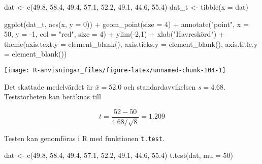 \documentclass[
]{book}
\newenvironment{Shaded}{\begin{snugshade}}{\end{snugshade}}
\newcommand{\AttributeTok}[1]{\textcolor[rgb]{0.77,0.63,0.00}{#1}}
\newcommand{\DecValTok}[1]{\textcolor[rgb]{0.00,0.00,0.81}{#1}}
\newcommand{\FloatTok}[1]{\textcolor[rgb]{0.00,0.00,0.81}{#1}}
\newcommand{\FunctionTok}[1]{\textcolor[rgb]{0.00,0.00,0.00}{#1}}
\newcommand{\NormalTok}[1]{#1}
\newcommand{\OtherTok}[1]{\textcolor[rgb]{0.56,0.35,0.01}{#1}}
\newcommand{\SpecialCharTok}[1]{\textcolor[rgb]{0.00,0.00,0.00}{#1}}
\newcommand{\StringTok}[1]{\textcolor[rgb]{0.31,0.60,0.02}{#1}}
\theoremstyle{definition}
\theoremstyle{definition}
\theoremstyle{definition}
\theoremstyle{definition}
\theoremstyle{remark}
\begin{document}
\begin{Shaded}
\begin{Highlighting}[]
\NormalTok{dat }\OtherTok{\textless{}{-}} \FunctionTok{c}\NormalTok{(}\FloatTok{49.8}\NormalTok{, }\FloatTok{58.4}\NormalTok{, }\FloatTok{49.4}\NormalTok{, }\FloatTok{57.1}\NormalTok{, }\FloatTok{52.2}\NormalTok{, }\FloatTok{49.1}\NormalTok{, }\FloatTok{44.6}\NormalTok{, }\FloatTok{55.4}\NormalTok{)}
\NormalTok{dat\_t }\OtherTok{\textless{}{-}} \FunctionTok{tibble}\NormalTok{(}\AttributeTok{x =}\NormalTok{ dat)}

\FunctionTok{ggplot}\NormalTok{(dat\_t, }\FunctionTok{aes}\NormalTok{(x, }\AttributeTok{y =} \DecValTok{0}\NormalTok{)) }\SpecialCharTok{+}
  \FunctionTok{geom\_point}\NormalTok{(}\AttributeTok{size =} \DecValTok{4}\NormalTok{) }\SpecialCharTok{+}
  \FunctionTok{annotate}\NormalTok{(}\StringTok{"point"}\NormalTok{, }\AttributeTok{x =} \DecValTok{50}\NormalTok{, }\AttributeTok{y =} \SpecialCharTok{{-}}\DecValTok{1}\NormalTok{, }\AttributeTok{col =} \StringTok{"red"}\NormalTok{, }\AttributeTok{size =} \DecValTok{4}\NormalTok{) }\SpecialCharTok{+}
  \FunctionTok{ylim}\NormalTok{(}\SpecialCharTok{{-}}\DecValTok{2}\NormalTok{,}\DecValTok{1}\NormalTok{) }\SpecialCharTok{+} \FunctionTok{xlab}\NormalTok{(}\StringTok{"Havreskörd"}\NormalTok{) }\SpecialCharTok{+}
  \FunctionTok{theme}\NormalTok{(}\AttributeTok{axis.text.y =} \FunctionTok{element\_blank}\NormalTok{(),}
        \AttributeTok{axis.ticks.y =} \FunctionTok{element\_blank}\NormalTok{(),}
        \AttributeTok{axis.title.y =} \FunctionTok{element\_blank}\NormalTok{())}
\end{Highlighting}
\end{Shaded}

\begin{center}\texttt{[image: R-anvisningar\_files/figure-latex/unnamed-chunk-104-1]} \end{center}

Det skattade medelvärdet är \(\bar x = 52.0\) och standardavvikelsen \(s = 4.68\). Teststorheten kan beräknas till

\[t = \frac{52 - 50}{4.68 / \sqrt 8} = 1.209\]

Testen kan genomföras i R med funktionen \texttt{t.test}.

\begin{Shaded}
\begin{Highlighting}[]
\NormalTok{dat }\OtherTok{\textless{}{-}} \FunctionTok{c}\NormalTok{(}\FloatTok{49.8}\NormalTok{, }\FloatTok{58.4}\NormalTok{, }\FloatTok{49.4}\NormalTok{, }\FloatTok{57.1}\NormalTok{, }\FloatTok{52.2}\NormalTok{, }\FloatTok{49.1}\NormalTok{, }\FloatTok{44.6}\NormalTok{, }\FloatTok{55.4}\NormalTok{)}
\FunctionTok{t.test}\NormalTok{(dat, }\AttributeTok{mu =} \DecValTok{50}\NormalTok{)}
\end{Highlighting}
\end{Shaded}
\end{document}
